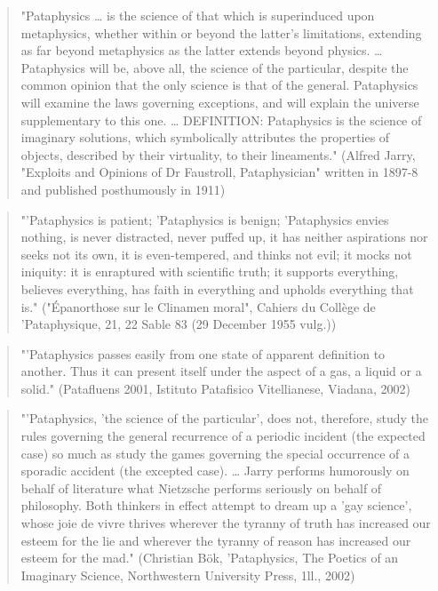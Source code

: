 \begin{quote}
  "Pataphysics … is the science of that which is superinduced upon metaphysics, whether within or beyond the latter's limitations, extending as far beyond metaphysics as the latter extends beyond physics. … Pataphysics will be, above all, the science of the particular, despite the common opinion that the only science is that of the general. Pataphysics will examine the laws governing exceptions, and will explain the universe supplementary to this one. … DEFINITION: Pataphysics is the science of imaginary solutions, which symbolically attributes the properties of objects, described by their virtuality, to their lineaments." (Alfred Jarry, "Exploits and Opinions of Dr Faustroll, Pataphysician" written in 1897-8 and published posthumously in 1911)\citep{Jarry1996}
\end{quote}

\begin{quote}
  "'Pataphysics is patient; 'Pataphysics is benign; 'Pataphysics envies nothing, is never distracted, never puffed up, it has neither aspirations nor seeks not its own, it is even-tempered, and thinks not evil; it mocks not iniquity: it is enraptured with scientific truth; it supports everything, believes everything, has faith in everything and upholds everything that is." ("Épanorthose sur le Clinamen moral", Cahiers du Collège de 'Pataphysique, 21, 22 Sable 83 (29 December 1955 vulg.))\citep{Brotchie2003}
\end{quote}

\begin{quote}
  "'Pataphysics passes easily from one state of apparent definition to another. Thus it can present itself under the aspect of a gas, a liquid or a solid." (Patafluens 2001, Istituto Patafisico Vitellianese, Viadana, 2002)\citep{Brotchie2003}
\end{quote}

\begin{quote}
  "'Pataphysics, 'the science of the particular', does not, therefore, study the rules governing the general recurrence of a periodic incident (the expected case) so much as study the games governing the special occurrence of a sporadic accident (the excepted case). … Jarry performs humorously on behalf of literature what Nietzsche performs seriously on behalf of philosophy. Both thinkers in effect attempt to dream up a 'gay science', whose joie de vivre thrives wherever the tyranny of truth has increased our esteem for the lie and wherever the tyranny of reason has increased our esteem for the mad." (Christian Bök, 'Pataphysics, The Poetics of an Imaginary Science, Northwestern University Press, 1ll., 2002)\citep{Bok2002}
\end{quote}

